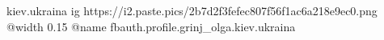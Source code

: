  
 
 
 
 

\par
kiev.ukraina
\ifcmt
  ig https://i2.paste.pics/2b7d2f3fefec807f56f1ac6a218e9ec0.png
  @width 0.15
	@name fbauth.profile.grinj_olga.kiev.ukraina
\fi
